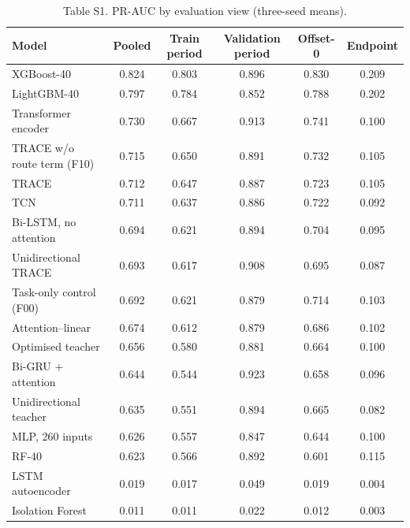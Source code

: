 \documentclass[10pt]{article}
\begin{document}
\begin{table}[h]\centering\small
\caption*{Table S1. PR-AUC by evaluation view (three-seed means).}
\begin{tabular}{lccccc}\toprule
Model & Pooled & Train period & Validation period & Offset-0 & Endpoint \\\midrule
XGBoost-40 & 0.824 & 0.803 & 0.896 & 0.830 & 0.209 \\
LightGBM-40 & 0.797 & 0.784 & 0.852 & 0.788 & 0.202 \\
Transformer encoder & 0.730 & 0.667 & 0.913 & 0.741 & 0.100 \\
TRACE w/o route term (F10) & 0.715 & 0.650 & 0.891 & 0.732 & 0.105 \\
TRACE & 0.712 & 0.647 & 0.887 & 0.723 & 0.105 \\
TCN & 0.711 & 0.637 & 0.886 & 0.722 & 0.092 \\
Bi-LSTM, no attention & 0.694 & 0.621 & 0.894 & 0.704 & 0.095 \\
Unidirectional TRACE & 0.693 & 0.617 & 0.908 & 0.695 & 0.087 \\
Task-only control (F00) & 0.692 & 0.621 & 0.879 & 0.714 & 0.103 \\
Attention--linear & 0.674 & 0.612 & 0.879 & 0.686 & 0.102 \\
Optimised teacher & 0.656 & 0.580 & 0.881 & 0.664 & 0.100 \\
Bi-GRU + attention & 0.644 & 0.544 & 0.923 & 0.658 & 0.096 \\
Unidirectional teacher & 0.635 & 0.551 & 0.894 & 0.665 & 0.082 \\
MLP, 260 inputs & 0.626 & 0.557 & 0.847 & 0.644 & 0.100 \\
RF-40 & 0.623 & 0.566 & 0.892 & 0.601 & 0.115 \\
LSTM autoencoder & 0.019 & 0.017 & 0.049 & 0.019 & 0.004 \\
Isolation Forest & 0.011 & 0.011 & 0.022 & 0.012 & 0.003 \\
\bottomrule\end{tabular}\end{table}
\end{document}
